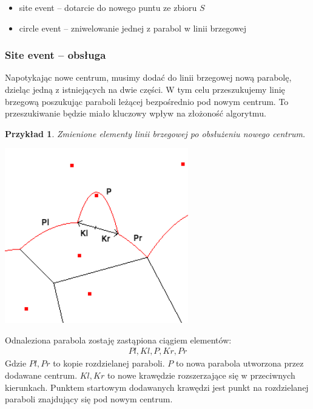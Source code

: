 \documentclass[declaration,shortabstract, inz]{iithesis}
\theoremstyle{definition} \newtheorem{definition}{Definicja}[]
\theoremstyle{plain} \newtheorem{remark}[definition]{Obserwacja}
\theoremstyle{plain} \newtheorem{theorem}[definition]{Twierdzenie}
\theoremstyle{plain} \newtheorem{example}{Przykład}[definition]
\theoremstyle{plain} \newtheorem{lemma}[definition]{Lemat}
\begin{document}
\begin{itemize}
	\item site event -- dotarcie do nowego puntu ze zbioru $S$
	\item circle event -- zniwelowanie jednej z parabol w linii brzegowej
\end{itemize}

\subsubsection{Site event -- obsługa}
\label{sec:site}
Napotykając nowe centrum, musimy dodać do linii brzegowej nową parabolę, dzieląc jedną z istniejących na dwie części. W tym celu przeszukujemy linię brzegową poszukując paraboli leżącej bezpośrednio pod nowym centrum. To przeszukiwanie będzie miało kluczowy wpływ na złożoność algorytmu. 

\begin{example}
	Zmienione elementy linii brzegowej po obsłużeniu nowego centrum.
	
	\begin{center}
		\includegraphics[width=0.6\textwidth]{ExampleSiteEvent}
	\end{center}
\end{example}

Odnaleziona parabola zostaję zastąpiona ciągiem elementów:
\begin{align}
 	Pl, Kl, P, Kr, Pr
\end{align}
Gdzie $Pl, Pr$ to kopie rozdzielanej paraboli. $P$ to nowa parabola utworzona przez dodawane centrum. $Kl, Kr$ to nowe krawędzie rozszerzające się w przeciwnych kierunkach. Punktem startowym dodawanych krawędzi jest punkt na rozdzielanej paraboli znajdujący się pod nowym centrum.
\end{document}
